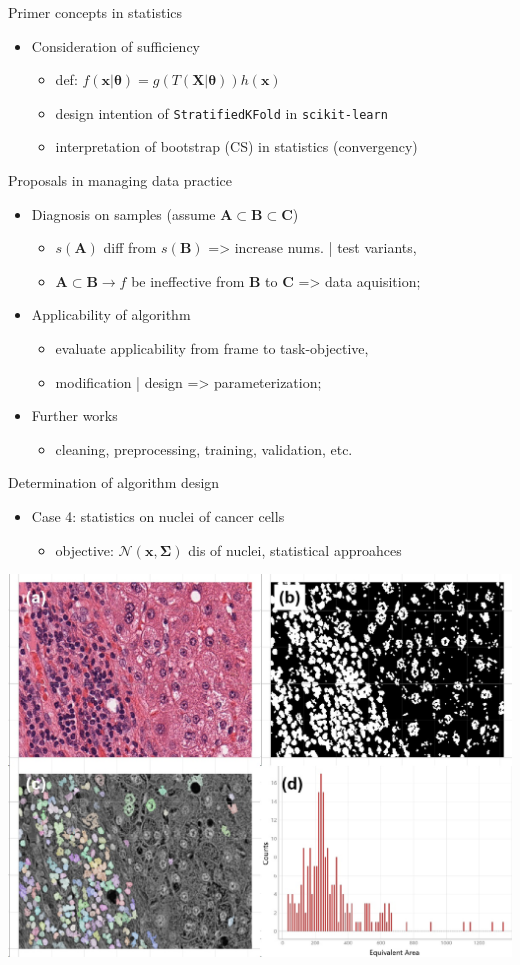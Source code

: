 \documentclass[11pt]{beamer}
\newcommand{\code}[1]{\texttt{#1}}
\newcommand{\uniitem}[1]{\begin{itemize}\item #1 \end{itemize}}
\begin{document}
\begin{frame}{Primer concepts in statistics}
	\uniitem{Consideration of sufficiency
		\uniitem{def: $f(\boldsymbol{x} | \boldsymbol{\theta}) = g(T(\boldsymbol{X} | \boldsymbol{\theta})) h(\boldsymbol{x})$}
		\uniitem{design intention of \code{StratifiedKFold} in \code{scikit-learn}}
		\uniitem{interpretation of bootstrap (CS) in statistics (convergency)}}
\end{frame}

\begin{frame}{Proposals in managing data practice}
	\uniitem{Diagnosis on samples (assume $\boldsymbol{A} \subset \boldsymbol{B} \subset \boldsymbol{C}$)
		\uniitem{$s(\boldsymbol{A})$ diff from $s(\boldsymbol{B})$ => increase nums. | test variants,}
		\uniitem{$\boldsymbol{A} \subset \boldsymbol{B} \rightarrow f$ be ineffective from $\boldsymbol{B}$ to $\boldsymbol{C}$ => data aquisition;}}
	\uniitem{Applicability of algorithm
		\uniitem{evaluate applicability from frame to task-objective,}
		\uniitem{modification | design => parameterization;}}
	\uniitem{Further works
		\uniitem{cleaning, preprocessing, training, validation, etc.}}
\end{frame}

\begin{frame}{Determination of algorithm design}
	\uniitem{Case 4: statistics on nuclei of cancer cells
		\uniitem{objective: $\mathcal{N}(\boldsymbol{x}, \boldsymbol{\Sigma})$ dis of nuclei, statistical approahces}}
	\centering
	\includegraphics[scale=0.43]{patho.jpg}
\end{frame}
\end{document}
